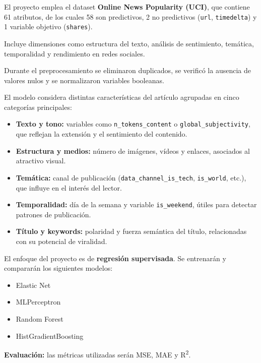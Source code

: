 \documentclass[12pt]{article}
\begin{document}
\begin{tcolorbox}[colback=CanvasGray,colframe=CanvasHeader,title=\textbf{Data Sources}]
El proyecto emplea el dataset \textbf{Online News Popularity (UCI)}, que contiene 61 atributos, de los cuales 58 son predictivos, 2 no predictivos (\texttt{url}, \texttt{timedelta}) y 1 variable objetivo (\texttt{shares}). 

Incluye dimensiones como estructura del texto, análisis de sentimiento, temática, temporalidad y rendimiento en redes sociales.

Durante el preprocesamiento se eliminaron duplicados, se verificó la ausencia de valores nulos y se normalizaron variables booleanas.
\end{tcolorbox}

\columnbreak

\begin{tcolorbox}[colback=CanvasGray,colframe=CanvasHeader,title=\textbf{Features}]
El modelo considera distintas características del artículo agrupadas en cinco categorías principales:
\begin{itemize}
    \item \textbf{Texto y tono:} variables como \texttt{n\_tokens\_content} o \texttt{global\_subjectivity}, que reflejan la extensión y el sentimiento del contenido.
    \item \textbf{Estructura y medios:} número de imágenes, vídeos y enlaces, asociados al atractivo visual.
    \item \textbf{Temática:} canal de publicación (\texttt{data\_channel\_is\_tech}, \texttt{is\_world}, etc.), que influye en el interés del lector.
    \item \textbf{Temporalidad:} día de la semana y variable \texttt{is\_weekend}, útiles para detectar patrones de publicación.
    \item \textbf{Título y keywords:} polaridad y fuerza semántica del título, relacionadas con su potencial de viralidad.
\end{itemize}
\end{tcolorbox}

\begin{tcolorbox}[colback=CanvasBlue!20,colframe=CanvasHeader,title=\textbf{Building Models}]
El enfoque del proyecto es de \textbf{regresión supervisada}. Se entrenarán y compararán los siguientes modelos:
\begin{itemize}
    \item Elastic Net
    \item MLPerceptron
    \item Random Forest
    \item HistGradientBoosting
\end{itemize}
\textbf{Evaluación:} las métricas utilizadas serán MSE, MAE y R\textsuperscript{2}.
\end{tcolorbox}
\end{document}
